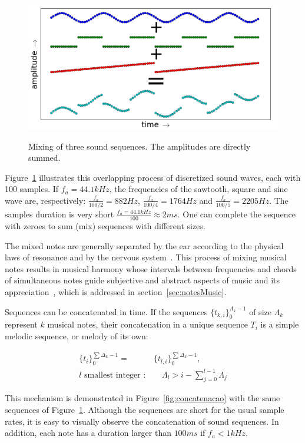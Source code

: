 \begin{figure}[h!]
    {\centering
        \includegraphics[width=.5\columnwidth]{figures/mixagem__}}
    \caption{Mixing of three sound sequences. The amplitudes are directly summed.}
        \label{fig:mixagem}
\end{figure}

Figure~\ref{fig:mixagem} illustrates this overlapping process of discretized sound waves, each with 100 samples. If $f_a=44.1kHz$, the frequencies of the sawtooth, square and sine wave are, respectively: $\frac{f_a}{100/2}=882Hz$, $\frac{f_a}{100/4}=1764Hz$ and $\frac{f_a}{100/5}=2205Hz$. The samples duration is very short $\frac{f_a=44.1kHz}{100} \approx 2ms$. One can complete the sequence with zeroes to sum (mix) sequences with different sizes.

The mixed notes are generally separated by the ear according to the physical laws of resonance and by the nervous system~\cite{Roederer}.  This process of mixing musical notes results in musical harmony whose intervals between frequencies and chords of simultaneous notes guide subjective and abstract aspects of music and its appreciation~\cite{Harmonia}, which is addressed in section~\ref{sec:notesMusic}. 

Sequences can be concatenated in time. If the sequences $\{t_{k,i}\}_0^{\Lambda_k-1}$ of size $\Lambda_k$ represent $k$ musical notes, their concatenation in a unique sequence $T_i$ is a simple melodic sequence, or melody of its own:

\begin{equation}\label{eq:concatenacao}
\begin{split}
\{t_i\}_0^{\sum\Delta_k-1}= & \{t_{l,i}\}_0^{\sum\Delta_k-1}, \;\; \\ l\text{ smallest integer } : & \quad \Lambda_l > i -\sum_{j=0}^{l-1}\Lambda_j
\end{split}
\end{equation}

This mechanism is demonstrated in Figure~\ref{fig:concatenacao} with the same sequences of Figure~\ref{fig:mixagem}. Although the sequences are short for the usual sample rates, it is easy to visually observe the concatenation of sound sequences. In addition, each note has  a duration larger than $100ms$ if $f_a<1kHz$.

